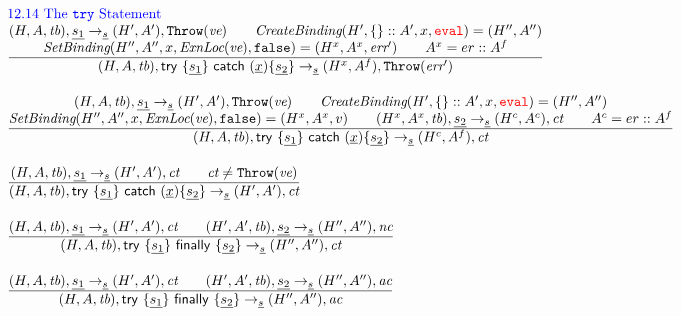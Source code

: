 \documentclass[a4paper, leqno]{amsart}
\newcommand{\rulesep}{\quad\quad}
\newcommand{\stmt}{s}
\newcommand{\ir}[1]{\ensuremath{\underline{#1}}}
\newcommand{\irid}{\ir{x}}
\def\inred{\color{red}}
\def\inblue{\color{blue}}
\newcommand{\eval}{{\inred\tt eval}}
\newcommand{\false}{{\tt false}}
\newcommand{\tb}{\emph{tb}}
\newcommand{\err}{\emph{err}}
\newcommand{\ct}{\emph{ct}}
\newcommand{\ac}{\emph{ac}}
\newcommand{\nc}{\emph{nc}}
\newcommand{\hf}[1]{\emph{#1}}
\newcommand{\state}{\ensuremath{(H,A,\tb)}}
\newcommand{\statel}{\ensuremath{(H,A,\tb)}}
\newcommand{\statepl}{\ensuremath{(H',A',\tb)}}
\newcommand{\resp}{\ensuremath{(H',A')}}
\newcommand{\respp}{\ensuremath{(H'',A'')}}
\newcommand{\irtrycat}{\ensuremath{{\sf try} \ {\tt\{} \ir{\stmt_1} {\tt\}} \
{\sf catch} \ {\tt(}\irid{\tt)\{} \ir{\stmt_2} {\tt\}}}}
\newcommand{\irtryfin}{\ensuremath{{\sf try} \ {\tt\{} \ir{\stmt_1} {\tt\}} \
{\sf finally} \ {\tt\{} \ir{\stmt_2} {\tt\}}}}
\def\inred{\color{red}}
\def\inblue{\color{blue}}
\begin{document}
\[
\begin{array}{l@{~~}l@{~~}ll}
\mbox{\inblue 12.14 The {\tt try} Statement}\\
\frac{\begin{matrix}
\statel, \ir{\stmt_1} \rightarrow_{\ir\stmt} \resp, {\tt Throw}(\emph{ve})
\rulesep
\hf{CreateBinding}(H', \{\}::A',x,\eval)=\respp
\\
\hf{SetBinding}(H'', A'', x, \hf{ExnLoc}(\emph{ve}), \false) = (H^x, A^x, \err')
\rulesep
A^x = er::A^f
\end{matrix}}{\begin{matrix}
\state, \irtrycat \rightarrow_{\ir\stmt} (H^x, A^f), {\tt Throw}(\err')
\end{matrix}}
\\[2em]

\frac{\begin{matrix}
\statel, \ir{\stmt_1} \rightarrow_{\ir\stmt} \resp, {\tt Throw}(\emph{ve})
\rulesep
\hf{CreateBinding}(H',\{\}::A',x,\eval)=\respp
\\
\hf{SetBinding}(H'', A'', x, \hf{ExnLoc}(\emph{ve}), \false) = (H^x, A^x, v)
\rulesep
(H^x, A^x, \tb), \ir{\stmt_2} \rightarrow_{\ir\stmt} (H^c, A^c), \ct
\rulesep
A^c = er::A^f
\end{matrix}}{\begin{matrix}
\state, \irtrycat \rightarrow_{\ir\stmt} (H^c, A^f), \ct
\end{matrix}}
\\[2em]

\frac{\begin{matrix}
\statel, \ir{\stmt_1} \rightarrow_{\ir\stmt} \resp, \ct
\rulesep
\ct \not= {\tt Throw}(\emph{ve})
\end{matrix}}{\begin{matrix}
\state, \irtrycat \rightarrow_{\ir\stmt} \resp, \ct
\end{matrix}}
\\[2em]


\frac{\begin{matrix}
\statel, \ir{\stmt_1} \rightarrow_{\ir\stmt} \resp, \ct
\rulesep
\statepl, \ir{\stmt_2} \rightarrow_{\ir\stmt} \respp, \nc
\end{matrix}}{\begin{matrix}
\state, \irtryfin \rightarrow_{\ir\stmt}  \respp, \ct
\end{matrix}}
\\[2em]

\frac{\begin{matrix}
\statel, \ir{\stmt_1} \rightarrow_{\ir\stmt} \resp, \ct
\rulesep
\statepl, \ir{\stmt_2} \rightarrow_{\ir\stmt} \respp, \ac
\end{matrix}}{\begin{matrix}
\state, \irtryfin \rightarrow_{\ir\stmt} \respp, \ac
\end{matrix}}
\\[2em]


\end{array}\]
\end{document}
